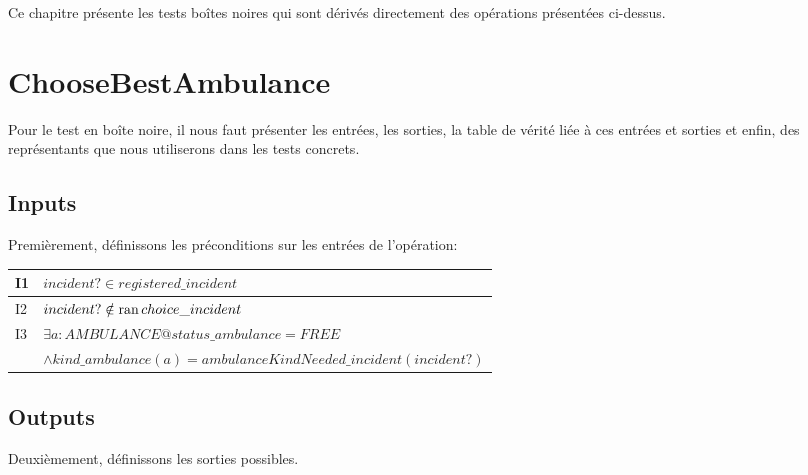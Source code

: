 \documentclass{report}
\begin{document}
Ce chapitre présente les tests boîtes noires qui sont dérivés directement
des opérations présentées ci-dessus.

\section{ChooseBestAmbulance}

Pour le test en boîte noire, il nous faut présenter les entrées,
les sorties, la table de vérité liée à ces entrées et sorties et enfin, 
des représentants que nous utiliserons dans les tests concrets.

\subsection{Inputs}

Premièrement, définissons les préconditions sur les entrées de l'opération:

\noindent\begin{minipage}{\marginparsep+\marginparwidth+\marginparpush+\textwidth}
\begin{tabularx}{\textwidth}{|l|X|}
	\hline
	I1 & $incident? \in registered\_incident$ \\
	\hline
	I2 & $incident? \notin \mathop{\mathrm{ran}} choice\_incident$ \\
	\hline
	I3 & $\exists a: AMBULANCE @ status\_ambulance = FREE$\\&$ \land
  	 kind\_ambulance(a) = ambulanceKindNeeded\_incident(incident?)$ \\
	\hline
\end{tabularx}
\end{minipage}

\subsection{Outputs}

Deuxièmement, définissons les sorties possibles.
\end{document}
